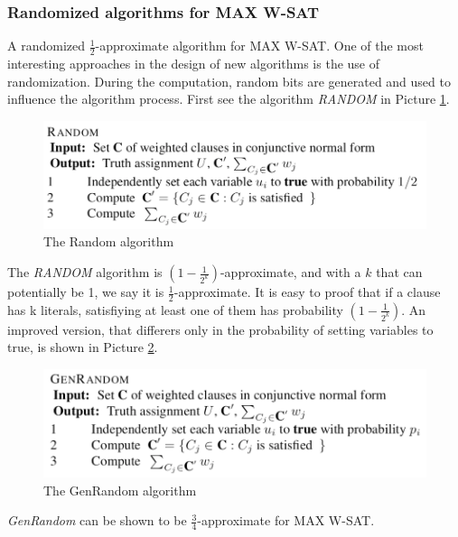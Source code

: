 \documentclass[10pt]{article}
\begin{document}
\subsubsection{Randomized algorithms for MAX W-SAT}
A randomized $\frac{1}{2}$-approximate algorithm for MAX W-SAT. One of the most interesting approaches in the design of new algorithms is the use of randomization. During the computation, random bits are generated and used to influence the algorithm process. First see the algorithm \textit{RANDOM} in Picture \ref{fig:randomsat}.

\begin{figure}[H]
\includegraphics[scale=0.3]{randomsat}
\caption{The Random algorithm}
\centering
\label{fig:randomsat}
\end{figure}

The \textit{RANDOM} algorithm is $(1 - \frac{1}{2^k})$-approximate, and with a $k$ that can potentially be 1, we say it is $\frac{1}{2}$-approximate. It is easy to proof that if a clause has k literals, satisfiying at least one of them has probability  $(1 - \frac{1}{2^k})$.  An improved version, that differers only in the probability of setting variables to true, is shown in Picture \ref{fig:genrandom}.

\begin{figure}[H]
\includegraphics[scale=0.3]{genrandom}
\caption{The GenRandom algorithm}
\centering
\label{fig:genrandom}
\end{figure}

\textit{GenRandom} can be shown to be $\frac{3}{4}$-approximate for MAX W-SAT.
\end{document}
